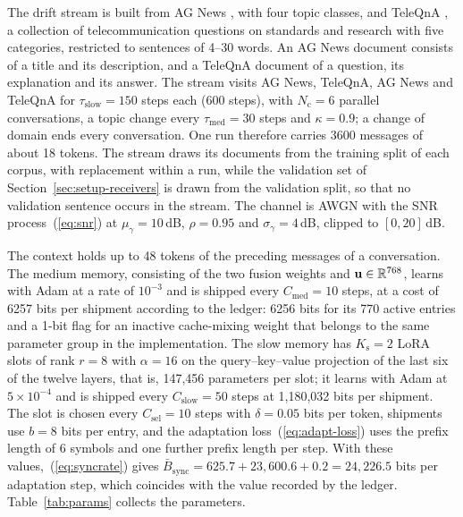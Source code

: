 The drift stream is built from AG News \cite{zhang2015agnews}, with four topic classes, and TeleQnA \cite{maatouk2023teleqna}, a collection of telecommunication questions on standards and research with five categories, restricted to sentences of 4--30 words. An AG News document consists of a title and its description, and a TeleQnA document of a question, its explanation and its answer. The stream visits AG News, TeleQnA, AG News and TeleQnA for $\tau_\mathrm{slow} = 150$ steps each (600 steps), with $N_\mathrm{c} = 6$ parallel conversations, a topic change every $\tau_\mathrm{med} = 30$ steps and $\kappa = 0.9$; a change of domain ends every conversation. One run therefore carries 3600 messages of about 18 tokens. The stream draws its documents from the training split of each corpus, with replacement within a run, while the validation set of Section~\ref{sec:setup-receivers} is drawn from the validation split, so that no validation sentence occurs in the stream. The channel is AWGN with the SNR process~(\ref{eq:snr}) at $\mu_\gamma = 10$\,dB, $\rho = 0.95$ and $\sigma_\gamma = 4$\,dB, clipped to $[0,20]$\,dB.

The context holds up to 48 tokens of the preceding messages of a conversation. The medium memory, consisting of the two fusion weights and $\mathbf{u}\in\mathbb{R}^{768}$, learns with Adam at a rate of $10^{-3}$ and is shipped every $C_\mathrm{med} = 10$ steps, at a cost of 6257 bits per shipment according to the ledger: 6256 bits for its 770 active entries and a 1-bit flag for an inactive cache-mixing weight that belongs to the same parameter group in the implementation. The slow memory has $K_\mathrm{s} = 2$ LoRA slots of rank $r = 8$ with $\alpha = 16$ on the query--key--value projection of the last six of the twelve layers, that is, 147,456 parameters per slot; it learns with Adam at $5\times10^{-4}$ and is shipped every $C_\mathrm{slow} = 50$ steps at 1,180,032 bits per shipment. The slot is chosen every $C_\mathrm{sel} = 10$ steps with $\delta = 0.05$ bits per token, shipments use $b = 8$ bits per entry, and the adaptation loss~(\ref{eq:adapt-loss}) uses the prefix length of 6 symbols and one further prefix length per step. With these values,~(\ref{eq:syncrate}) gives $\bar{B}_\mathrm{sync} = 625.7 + 23{,}600.6 + 0.2 = 24{,}226.5$ bits per adaptation step, which coincides with the value recorded by the ledger. Table~\ref{tab:params} collects the parameters.

